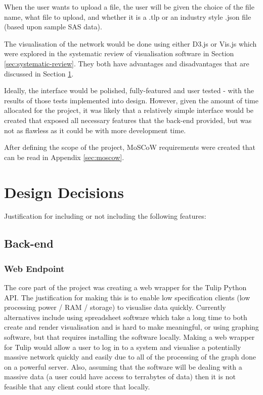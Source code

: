 \documentclass[../dissertation.tex]{subfiles}
\begin{document}
When the user wants to upload a file, the user will be given the choice of the file name, what file to upload, and whether it is a .tlp or an industry style .json file (based upon sample SAS data).

The visualisation of the network would be done using either D3.js or Vis.js which were explored in the systematic review of visualisation software in Section \ref{sec:systematic-review}. They both have advantages and disadvantages that are discussed in Section \ref{sec:designdec}. 

Ideally, the interface would be polished, fully-featured and user tested - with the results of those tests implemented into design. However, given the amount of time allocated for the project, it was likely that a relatively simple interface would be created that exposed all necessary features that the back-end provided, but was not as flawless as it could be with more development time.

After defining the scope of the project, MoSCoW requirements were created that can be read in Appendix \ref{sec:moscow}.

\section{Design Decisions}
\label{sec:designdec}

Justification for including or not including the following features:

\subsection{Back-end}

\subsubsection{Web Endpoint}

The core part of the project was creating a web wrapper for the Tulip Python API. The justification for making this is to enable low specification clients (low processing power / RAM / storage) to visualise data quickly. Currently alternatives include using spreadsheet software which take a long time to both create and render visualisation and is hard to make meaningful, or using graphing software, but that requires installing the software locally. Making a web wrapper for Tulip would allow a user to log in to a system and visualise a potentially massive network quickly and easily due to all of the processing of the graph done on a powerful server. Also, assuming that the software will be dealing with a massive data (a user could have access to terrabytes of data) then it is not feasible that any client could store that locally.
\end{document}
